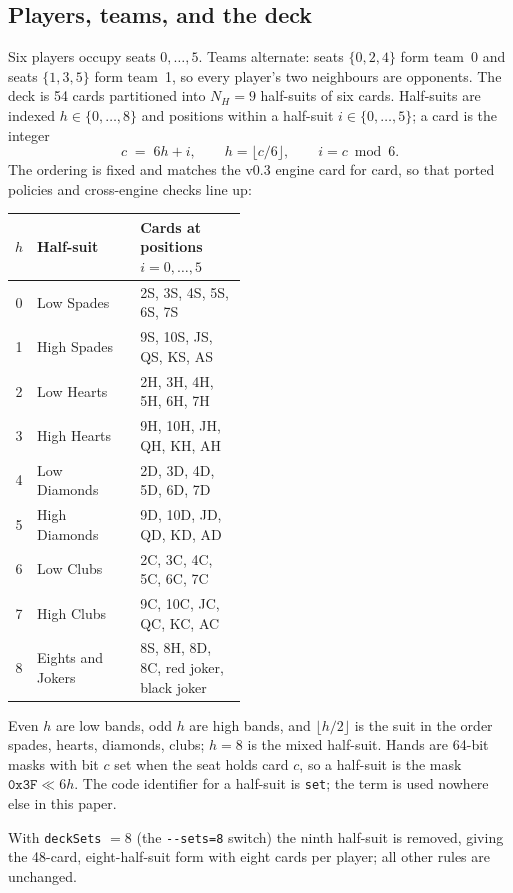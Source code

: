 \subsection{Players, teams, and the deck}

Six players occupy seats $0,\dots,5$. Teams alternate: seats $\{0,2,4\}$ form
team~0 and seats $\{1,3,5\}$ form team~1, so every player's two neighbours are
opponents. The deck is 54 cards partitioned into $N_H = 9$ half-suits of six
cards. Half-suits are indexed $h \in \{0,\dots,8\}$ and positions within a
half-suit $i \in \{0,\dots,5\}$; a card is the integer
\[
  c \;=\; 6h + i, \qquad h = \lfloor c/6 \rfloor, \qquad i = c \bmod 6 .
\]
The ordering is fixed and matches the v0.3 engine card for card, so that ported
policies and cross-engine checks line up:

\begin{center}
\small
\begin{tabular}{@{}clp{0.46\linewidth}@{}}
\toprule
$h$ & Half-suit & Cards at positions $i = 0,\dots,5$ \\
\midrule
0 & Low Spades    & 2S, 3S, 4S, 5S, 6S, 7S \\
1 & High Spades   & 9S, 10S, JS, QS, KS, AS \\
2 & Low Hearts    & 2H, 3H, 4H, 5H, 6H, 7H \\
3 & High Hearts   & 9H, 10H, JH, QH, KH, AH \\
4 & Low Diamonds  & 2D, 3D, 4D, 5D, 6D, 7D \\
5 & High Diamonds & 9D, 10D, JD, QD, KD, AD \\
6 & Low Clubs     & 2C, 3C, 4C, 5C, 6C, 7C \\
7 & High Clubs    & 9C, 10C, JC, QC, KC, AC \\
8 & Eights and Jokers & 8S, 8H, 8D, 8C, red joker, black joker \\
\bottomrule
\end{tabular}
\end{center}

Even $h$ are low bands, odd $h$ are high bands, and $\lfloor h/2 \rfloor$ is the
suit in the order spades, hearts, diamonds, clubs; $h = 8$ is the mixed
half-suit. Hands are 64-bit masks with bit $c$ set when the seat holds card $c$,
so a half-suit is the mask $\mathtt{0x3F} \ll 6h$. The code identifier for a
half-suit is \texttt{set}; the term is used nowhere else in this paper.

With \texttt{deckSets} $=8$ (the \texttt{-{}-sets=8} switch) the ninth half-suit
is removed, giving the 48-card, eight-half-suit form with eight cards per
player; all other rules are unchanged.

